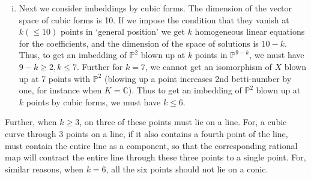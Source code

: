 \begin{enumerate}[i)]
  Suppose we try to get an imbedding of $\mathbb{P}^2$ blown up at two
  points in $\mathbb{P}^3$, by using the quadratic forms vanishing at
  these points. We do get a morphism of the blown up variety onto a
  quadratic surface in $\mathbb{P}^3$. However, since any conic must
  intersect a line at almost two points unless it contains it as a
  component, the whole of the line joining the two chosen points is
  mapped into a single point in $\mathbb{P}^3$. It can be checked
  directly that the morphism $X' \to \mathbb{P}^3$ so obtained is
  biregular in the complement of the proper transform of this line, but
  contracts\pageoriginale the proper transform of this line to a point on the
  quadric surface. 

\item Next we consider imbeddings by cubic forms. The dimension of the
  vector space of cubic forms is 10. If we impose the condition that
  they vanish at $k(\leq 10)$ points in `general position' we get $k$
  homogeneous linear equations for the coefficients, and the dimension
  of the space of solutions is $10-k$. Thus, to get an imbedding of
  $\mathbb{P}^2$ blown up at $k$ points in $\mathbb{P}^{9-k}$, we must
  have $9-k \geq 2, k \leq 7$. Further for $k=7$, we cannot get an
  isomorphism of $X$ blown up at 7 points with $\mathbb{P}^2$
  (blowing up a point increases 2nd betti-number by one, for instance
  when $K = \mathbb{C}$). Thus to get an imbedding of
  $\mathbb{P}^2$ blown up at $k$ points by cubic forms, we must have
  $k \leq 6$. 
\end{enumerate}

Further, when $k \geq 3$, on three of these points must lie on a
line. For, a cubic curve through 3 points on a line, if it also
contains a fourth point of the line, must contain the entire line as a
component, so that the corresponding rational map will contract the
entire line through these three points to a single point. For, similar
reasons, when $k=6$, all the six points should not lie on a conic. 


